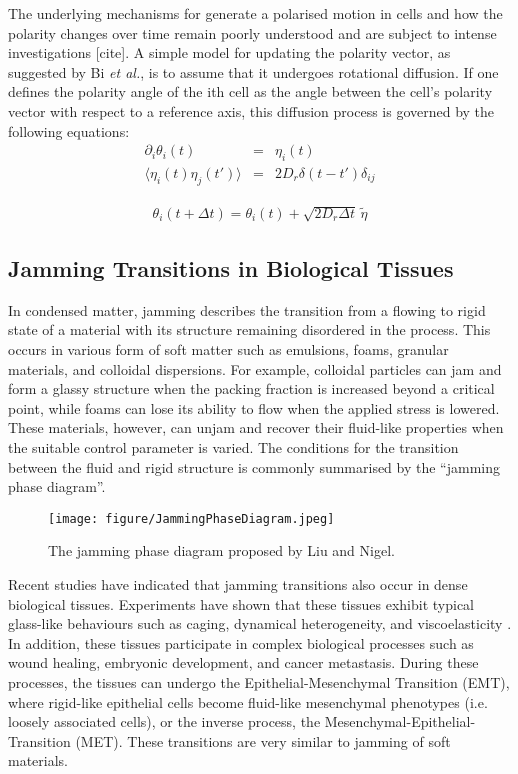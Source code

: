 \documentclass[a4paper,12pt]{article}
\newcommand{\etal}{\textit{et al.}}
\begin{document}
The underlying mechanisms for generate a polarised motion in cells and how the polarity changes over time remain poorly understood and are subject to intense investigations [cite]. A simple model for updating the polarity vector, as suggested by Bi \etal, is to assume that it undergoes rotational diffusion. If one defines the polarity angle of the ith cell as the angle between the cell’s polarity vector with respect to a reference axis, this diffusion process is governed by the following equations:
\begin{eqnarray}
\partial_i\theta_i(t) & = & \eta_i(t)\\
\langle{\eta_i(t)\eta_j(t')\rangle} & = & 2D_r\delta(t-t')\delta_{ij}
\end{eqnarray}

\begin{eqnarray}
\theta_i(t+\Delta t) = \theta_i(t) + \sqrt{2D_r\Delta t}\,\tilde\eta
\end{eqnarray}

\subsection{Jamming Transitions in Biological Tissues}
In condensed matter, jamming describes the transition from a flowing to rigid state of a material with its structure remaining disordered in the process. This occurs in various form of soft matter such as emulsions, foams, granular materials, and colloidal dispersions\cite{hecke2010}. For example, colloidal particles can jam and form a glassy structure when the packing fraction is increased beyond a critical point, while foams can lose its ability to flow when the applied stress is lowered. These materials, however, can unjam and recover their fluid-like properties when the suitable control parameter is varied. The conditions for the transition between the fluid and rigid structure is commonly summarised by the ``jamming phase diagram''\cite{liu2010}.

\begin{figure}[h]
\centering
\texttt{[image: figure/JammingPhaseDiagram.jpeg]}
\caption{The jamming phase diagram proposed by Liu and Nigel.}
\label{fig:JammingPhaseDiagram}
\end{figure}

Recent studies have indicated that jamming transitions also occur in dense biological tissues. Experiments have shown that these tissues exhibit typical glass-like behaviours such as caging, dynamical heterogeneity, and viscoelasticity \cite{schoetz2013,angelini2011}. In addition, these tissues participate in complex biological processes such as wound healing, embryonic development, and cancer metastasis. During these processes, the tissues can undergo the Epithelial-Mesenchymal Transition (EMT), where rigid-like epithelial cells become fluid-like mesenchymal phenotypes (i.e. loosely associated cells), or the inverse process, the Mesenchymal-Epithelial-Transition (MET). These transitions are very similar to jamming of soft materials. 
\end{document}
